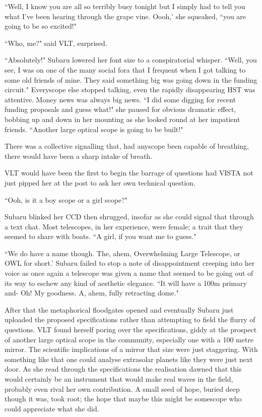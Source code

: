 \documentclass[12pt]{iopart}
\begin{document}
``Well, I know you are all so terribly busy tonight but I simply had to tell you what I've been hearing through the grape vine. Oooh,' she squeaked, ``you are going to be so excited!"

``Who, me?" said VLT, surprised.

``Absolutely!" Subaru lowered her font size to a conspiratorial whisper. ``Well, you see, I was on one of the many social fora that I frequent when I got talking to some old friends of mine. They said something big was going down in the funding circuit." Everyscope else stopped talking, even the rapidly disappearing HST was attentive. Money news was always big news. ``I did some digging for recent funding proposals and guess what!" she paused for obvious dramatic effect, bobbing up and down in her mounting as she looked round at her impatient friends. ``Another large optical scope is going to be built!"

There was a collective signalling that, had anyscope been capable of breathing, there would have been a sharp intake of breath.

VLT would have been the first to begin the barrage of questions had VISTA not just pipped her at the post to ask her own technical question.
 
``Ooh, is it a boy scope or a girl scope?"

Subaru blinked her CCD then shrugged, insofar as she could signal that through a text chat. Most telescopes, in her experience, were female; a trait that they seemed to share with boats. ``A girl, if you want me to guess."

``We do have a name though. The, ahem, Overwhelming Large Telescope, or OWL for short.' Subaru failed to stop a note of disappointment creeping into her voice as once again a telescope was given a name that seemed to be going out of its way to eschew any kind of aesthetic elegance. ``It will have a 100m primary and- Oh! My goodness. A, ahem, fully retracting dome."

After that the metaphorical floodgates opened and eventually Subaru just uploaded the proposed specifications rather than attempting to field the flurry of questions. VLT found herself poring over the specifications, giddy at the prospect of another large optical scope in the community, especially one with a 100 metre mirror. The scientific implications of a mirror that size were just staggering. With something like that one could analyse extrasolar planets like they were just next door. As she read through the specifications the realisation dawned that this would certainly be an instrument that would make real waves in the field, probably even rival her own contribution. A small seed of hope, buried deep though it was, took root; the hope that maybe this might be somescope who could appreciate what she did.
\end{document}
